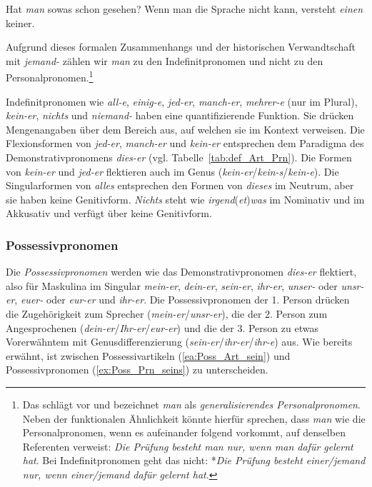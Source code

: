 \ea \label{ea:man_einen_einem}
\ea \label{ea:man} Hat \textit{man} sowas schon gesehen?
\ex \label{ex:einen} Wenn man die Sprache nicht kann, versteht  \textit{einen} keiner.
\z 
\z

Aufgrund dieses formalen Zusammenhangs und der historischen Verwandtschaft mit \textit{jemand-} zählen wir \textit{man} zu den Indefinitpronomen und nicht zu den Personalpronomen.\footnote{Das schlägt \citet[13]{Haspelmath1997} vor und bezeichnet \textit{man} als \textit{generalisierendes Personalpronomen}. Neben der funktionalen Ähnlichkeit könnte hierfür sprechen, dass \textit{man} wie die Personalpronomen, wenn es aufeinander folgend vorkommt, auf denselben Referenten verweist: \textit{Die Prüfung besteht man nur, wenn man dafür gelernt hat}. Bei Indefinitpronomen geht das nicht: *\textit{Die Prüfung besteht einer/jemand nur, wenn einer/jemand dafür gelernt hat}.}

Indefinitpronomen wie \textit{all-e}, \textit{einig-e}, \textit{jed-er}, \textit{manch-er}, \textit{mehrer-e} (nur im Plural), \textit{kein-er}, \textit{nichts} und \textit{niemand-} haben eine quantifizierende Funktion. Sie drücken Mengenangaben über dem Bereich aus, auf welchen sie im Kontext verweisen. Die Flexionsformen von \textit{jed-er}, \textit{manch-er} und \textit{kein-er} entsprechen dem Paradigma des Demonstrativpronomens \textit{dies-er} (vgl. Tabelle~\ref{tab:def_Art_Prn}). Die Formen von \textit{kein-er} und \textit{jed-er} flektieren auch im Genus (\textit{kein-er}/\textit{kein-s}/\textit{kein-e}). Die Singularformen von \textit{alles} entsprechen den Formen von \textit{dieses} im Neutrum, aber sie haben keine Genitivform. \textit{Nichts} steht wie \textit{irgend}(\textit{et})\textit{was} im Nominativ und im Akkusativ und verfügt über keine Genitivform.  


\subsubsection{Possessivpronomen}\label{subsubsection:PossPronomen}

Die \textit{Possessivpronomen} werden wie das Demonstrativpronomen \textit{dies-er} flektiert, also für Maskulina im Singular \textit{mein-er}, \textit{dein-er}, \textit{sein-er}, \textit{ihr-er}, \textit{unser-} oder \textit{unsr-er}, \textit{euer-} oder \textit{eur-er} und \textit{ihr-er}. Die Possessivpronomen der 1. Person drücken die Zugehörigkeit zum Sprecher (\textit{mein-er}/\textit{unsr-er}), die der 2. Person zum Angesprochenen (\textit{dein-er}/\textit{Ihr-er}/\textit{eur-er}) und die der 3. Person zu etwas Vorerwähntem mit Genusdifferenzierung (\textit{sein-er}/\textit{ihr-er}/\textit{ihr-e}) aus. Wie bereits erwähnt, ist zwischen Possessivartikeln (\ref{ea:Poss_Art_sein}) und Possessivpronomen (\ref{ex:Poss_Prn_seins}) zu unterscheiden.

